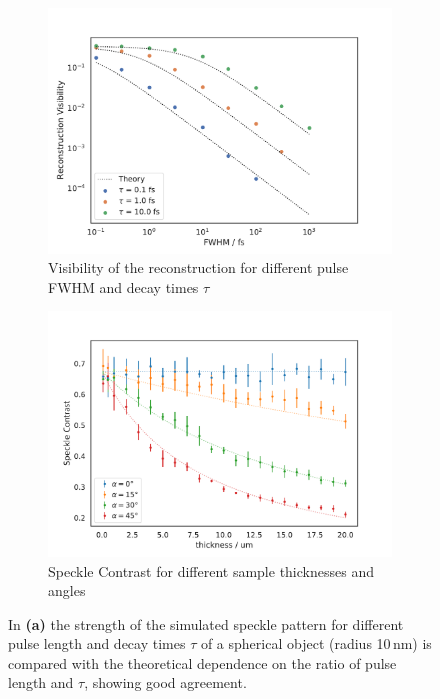 \begin{figure}
\begin{subfigure}[b]{0.45\textwidth}
		\centering
		\includegraphics[width=\linewidth]{images/timedependent_2.pdf}
		\caption{Visibility of the reconstruction for different pulse FWHM and decay times $\tau$}
		\label{fig:tdpshere_visrecons}
	\end{subfigure}
	\hspace{0.1cm}
	\begin{subfigure}[b]{0.45\textwidth}
		\includegraphics[width=\linewidth]{images/thickness.pdf}
		\caption{Speckle Contrast for different sample thicknesses and angles}
		\label{fig:thickness}
	\end{subfigure}	
	\caption[Speckle strength and signal visibility in time dependent simulation]{ In \textbf{(a)} the strength of the simulated speckle pattern for different pulse length and decay times $\tau$ of a spherical object (radius 10\,nm) is compared with the theoretical dependence on the ratio of pulse length and $\tau$, showing good agreement. 
}
\end{figure}
